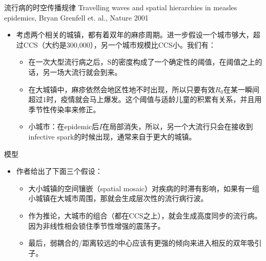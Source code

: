 \begin{frame}{流行病的时空传播规律}
    Travelling waves and spatial hierarchies in measles epidemics, Bryan Grenfell et. al., Nature 2001
    \begin{itemize}
        \item 考虑两个相关的城镇，都有着双年的麻疹周期。进一步假设一个城市够大，超过CCS（大约是300,000），另一个城市规模比CCS小。我们有：
        \begin{itemize}
            \item 在一次大型流行病之后，S的密度构成了一个确定性的阈值，在阈值之上的话，另一场大流行就会到来。
            \item 在大城镇中，麻疹依然会地区性地不时出现，所以只要有效$R_0$在某一瞬间超过$1$时，疫情就会马上爆发。这个阈值与适龄儿童的积累有关系，并且用季节性传染率来修正。
            \item 小城市：在epidemic后$I$在局部消失，所以，另一个大流行只会在接收到infective spark的时候出现，通常来自于更大的城镇。
        \end{itemize}
        \end{itemize}
\end{frame}

\begin{frame}{模型}
    \begin{itemize}
        \item 作者给出了下面三个假设：
        \begin{itemize}
            \item 大小城镇的空间镶嵌（spatial mosaic）对疾病的时滞有影响，如果有一组小城镇在大城市周围，那就会生成层次性的流行病行波。
            \item 作为推论，大城市的组合（都在CCS之上），就会生成高度同步的流行病。因为非线性相会锁住季节性增强的震荡子。
            \item 最后，弱耦合的/距离较远的中心应该有更强的倾向来进入相反的双年吸引子。
        \end{itemize}
    \end{itemize}
\end{frame}

